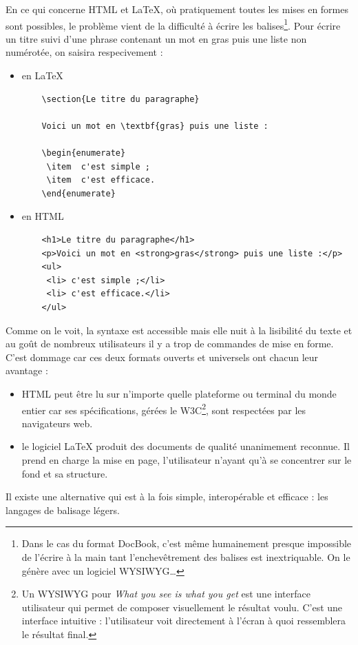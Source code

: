 \documentclass[12pt]{article}
\begin{document}
En ce qui concerne HTML et LaTeX, où pratiquement toutes les mises en
formes sont possibles, le problème vient de la difficulté à écrire les
balises\footnote{Dans le cas du format DocBook, c'est même humainement
  presque impossible de l'écrire à la main tant l'enchevêtrement des
  balises est inextriquable. On le génère avec un logiciel
  WYSIWYG\ldots{}}. Pour écrire un titre suivi d'une phrase contenant un
mot en gras puis une liste non numérotée, on saisira respecivement :

\begin{itemize}
\item
  en LaTeX

\begin{verbatim}
    \section{Le titre du paragraphe}

    Voici un mot en \textbf{gras} puis une liste :

    \begin{enumerate}
     \item  c'est simple ;
     \item  c'est efficace.
    \end{enumerate}
\end{verbatim}
\item
  en HTML

\begin{verbatim}
    <h1>Le titre du paragraphe</h1>
    <p>Voici un mot en <strong>gras</strong> puis une liste :</p>
    <ul>
     <li> c'est simple ;</li>
     <li> c'est efficace.</li>
    </ul>
\end{verbatim}
\end{itemize}
Comme on le voit, la syntaxe est accessible mais elle nuit à la
lisibilité du texte et au goût de nombreux utilisateurs il y a trop de
commandes de mise en forme. C'est dommage car ces deux formats ouverts
et universels ont chacun leur avantage :

\begin{itemize}
\item
  HTML peut être lu sur n'importe quelle plateforme ou terminal du monde
  entier car ses spécifications, gérées le W3C\footnote{Un WYSIWYG pour
    \emph{What you see is what you get} est une interface utilisateur
    qui permet de composer visuellement le résultat voulu. C'est une
    interface intuitive : l'utilisateur voit directement à l'écran à
    quoi ressemblera le résultat final.}, sont respectées par les
  navigateurs web.
\item
  le logiciel LaTeX produit des documents de qualité unanimement
  reconnue. Il prend en charge la mise en page, l'utilisateur n'ayant
  qu'à se concentrer sur le fond et sa structure.
\end{itemize}
Il existe une alternative qui est à la fois simple, interopérable et
efficace : les langages de balisage légers.
\end{document}
